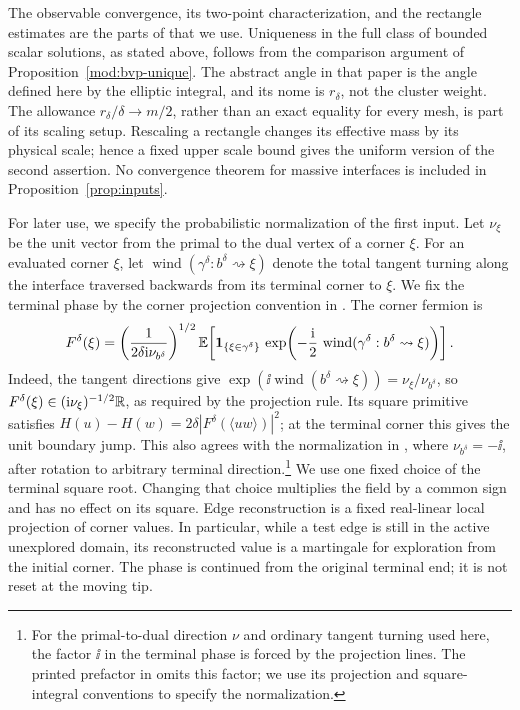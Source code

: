 The observable convergence, its two-point characterization, and the
rectangle estimates are the parts of \cite[Theorems 1.1 and 1.3,
Definition 5.2, Proposition 5.8]{Park} that we use. Uniqueness in the
full class of bounded scalar solutions, as stated above, follows from
the comparison argument of Proposition~\ref{mod:bvp-unique}.
The abstract angle in
that paper is the angle defined here by the elliptic integral, and its
nome is \(r_\delta\), not the cluster weight. The allowance
\(r_\delta/\delta\to m/2\), rather than an exact equality for every mesh,
is part of its scaling setup. Rescaling a rectangle changes its effective
mass by its physical scale; hence a fixed upper scale bound gives the
uniform version of the second assertion. No convergence theorem for
massive interfaces is included in Proposition~\ref{prop:inputs}.

For later use, we specify the probabilistic normalization of the first
input. Let \(\nu_\xi\) be the unit vector from the primal to
the dual vertex of a corner \(\xi\). For an evaluated corner
\(\xi\), let \(\operatorname{wind}(\gamma^\delta:b^\delta
\rightsquigarrow\xi)\) denote the total tangent turning along the
interface traversed backwards from its terminal corner to \(\xi\).
We fix the terminal phase by the corner projection convention in
\cite[Proposition~2.2 and Lemma~2.5]{Park}. The corner fermion is
\begin{equation}\label{geo:corner-observable}
 F^\delta(\xi)=
 \left(\frac{1}{2\delta\mathrm i\nu_{b^\delta}}\right)^{1/2}
 \mathbb E\!\left[
 \mathbf 1_{\{\xi\in\gamma^\delta\}}\,
 \exp\!\left(-\frac{\mathrm i}{2}\,
 \operatorname{wind}(\gamma^\delta:b^\delta\rightsquigarrow\xi)\right)
 \right].
\end{equation}
Indeed, the tangent directions give
\(\exp(\ii\operatorname{wind}(b^\delta\rightsquigarrow\xi))
=\nu_\xi/\nu_{b^\delta}\), so
\(F^\delta(\xi)\in(\mathrm i\nu_\xi)^{-1/2}\mathbb R\), as required by
the projection rule. Its square primitive satisfies
\(H(u)-H(w)=2\delta|F^\delta(\langle uw\rangle)|^2\);
at the terminal corner this gives the unit boundary jump.
This also agrees with the normalization in
\cite[Section~2.1.1]{CS}, where \(\nu_{b^\delta}=-\ii\), after
rotation to arbitrary terminal direction.\footnote{For the
primal-to-dual direction \(\nu\) and ordinary tangent turning used here,
the factor \(\ii\) in the terminal phase is forced by the projection
lines. The printed prefactor in \cite[Equation~(2.1)]{Park} omits
this factor; we use its projection and square-integral conventions
to specify the normalization.}
We use one fixed choice of the terminal square root. Changing that choice
multiplies the field by a common sign and has no effect on its square.
Edge reconstruction is a fixed real-linear local projection
of corner values. In particular, while a test edge is still in the
active unexplored domain, its reconstructed value is a martingale for
exploration from the initial corner. The phase is continued from the
original terminal end; it is not reset at the moving tip.

